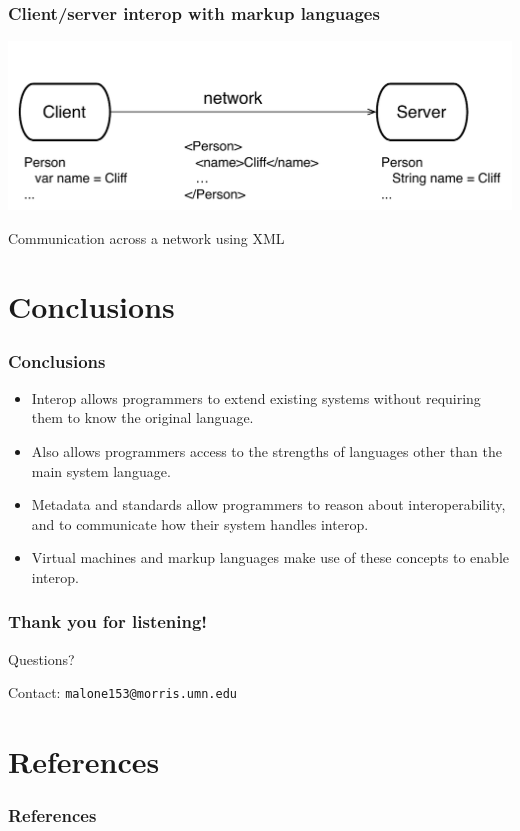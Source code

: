 \documentclass{beamer}
\newcommand{\linespace}{\vskip 0.25cm}
\newcommand{\mynotes}[1]{}
\begin{document}
 \begin{frame}
 \frametitle{Client/server interop with markup languages}
 \includegraphics[scale=0.6]{graphics/ClientServer.pdf}
 
 Communication across a network using XML
 
 \end{frame}

\section[Conclusions]{Conclusions}

\begin{frame}
  \frametitle{Conclusions}
  \begin{itemize}
  	\item Interop allows programmers to extend existing systems without requiring them to know the original language.
  	\item Also allows programmers access to the strengths of languages other than the main system language.
	\item Metadata and standards allow programmers to reason about interoperability, and to communicate how their system handles interop.
	\item Virtual machines and markup languages make use of these concepts to enable interop.
  \end{itemize}
\end{frame}




\begin{frame}
	\frametitle{Thank you for listening!}
	
	\mynotes{\cite{Ide:2010}}

	\linespace
	\linespace
	\linespace
	
	\begin{center}
	{\huge Questions?}
	\end{center}
	
    \linespace
	\linespace
	\linespace
	
	Contact:  
		\texttt{malone153@morris.umn.edu}
\end{frame}

\section*{References}

\begin{frame} 
	\frametitle{References} 
	
	
	
	
\end{frame} 
\end{document}
